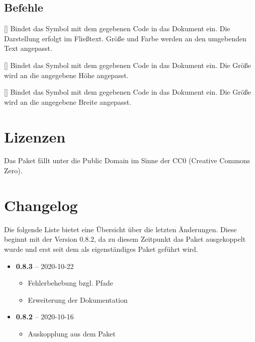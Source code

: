 \documentclass[a4paper,add-index]{cnltx-doc}
\begin{document}
\subsection{Befehle}
\begin{commands}
	[]
	Bindet das Symbol mit dem gegebenen Code in das Dokument ein.
	Die Darstellung erfolgt im Fließtext. Größe und Farbe werden an
	den umgebenden Text angepasst.
\begin{sidebyside}
  \Huge\color{yellow}
\end{sidebyside}
	[]
	Bindet das Symbol mit dem gegebenen Code in das Dokument ein.
	Die Größe wird an die angegebene Höhe angepasst.
\begin{sidebyside}
\end{sidebyside}
	[]
	Bindet das Symbol mit dem gegebenen Code in das Dokument ein.
	Die Größe wird an die angegebene Breite angepasst.
\begin{sidebyside}
\end{sidebyside}
\end{commands}



\section{Lizenzen}
Das Paket  fällt unter die Public Domain im Sinne der CC0 (Creative Commons Zero).


\section{Changelog}
Die folgende Liste bietet eine Übersicht über die letzten Änderungen. Diese beginnt mit der Version 0.8.2, da zu diesem Zeitpunkt das Paket ausgekoppelt wurde und erst seit dem als eigenständiges Paket geführt wird.
\begin{itemize}
    \item \textbf{0.8.3} -- 2020-10-22
        \begin{itemize}
            \item Fehlerbehebung bzgl. Pfade
            \item Erweiterung der Dokumentation
        \end{itemize}
    \item \textbf{0.8.2} -- 2020-10-16
        \begin{itemize}
            \item Auskopplung aus dem Paket 
        \end{itemize}
\end{itemize}
\end{document}
